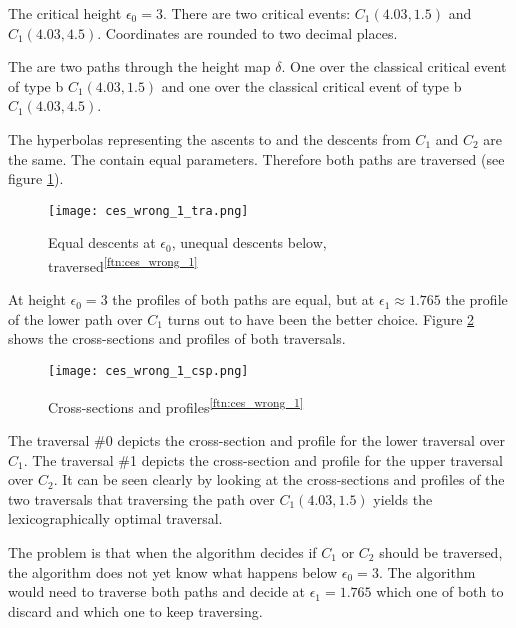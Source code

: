 The critical height $\epsilon_0 = 3$. There are two critical events: $C_1(4.03, 1.5)$ and $C_1(4.03, 4.5)$. Coordinates are rounded to two decimal places.

The are two paths through the height map $\delta$. One over the classical critical event of type b $C_1(4.03, 1.5)$ and one over the classical critical event of type b $C_1(4.03, 4.5)$.

The hyperbolas representing the ascents to and the descents from $C_1$ and $C_2$ are the same. The contain equal parameters. Therefore both paths are traversed (see figure \ref{fig:ces_wrong_1_tra}).

\begin{figure}[H]
	\centering
    
    \texttt{[image: ces\_wrong\_1\_tra.png]}
		
	\caption{Equal descents at $\epsilon_0$, unequal descents below, traversed\textsuperscript{\ref{ftn:ces_wrong_1}}}
    \label{fig:ces_wrong_1_tra}
\end{figure}

At height $\epsilon_0 = 3$ the profiles of both paths are equal, but at $\epsilon_1 \approx 1.765$ the profile of the lower path over $C_1$ turns out to have been the better choice. Figure \ref{fig:ces_wrong_1_csp} shows the cross-sections and profiles of both traversals.

\begin{figure}[H]
	\centering
    
    \texttt{[image: ces\_wrong\_1\_csp.png]}
		
	\caption{Cross-sections and profiles\textsuperscript{\ref{ftn:ces_wrong_1}}}
    \label{fig:ces_wrong_1_csp}
\end{figure}

The traversal \#0 depicts the cross-section and profile for the lower traversal over $C_1$. The traversal \#1 depicts the cross-section and profile for the upper traversal over $C_2$. It can be seen clearly by looking at the cross-sections and profiles of the two traversals that traversing the path over $C_1(4.03, 1.5)$ yields the lexicographically optimal traversal.

The problem is that when the algorithm decides if $C_1$ or $C_2$ should be traversed, the algorithm does not yet know what happens below $\epsilon_0 = 3$. The algorithm would need to traverse both paths and decide at $\epsilon_1 = 1.765$ which one of both to discard and which one to keep traversing.




